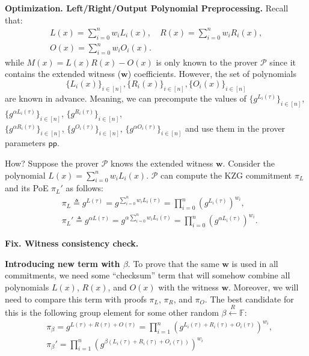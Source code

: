 \documentclass[../lecture-notes.tex]{subfiles}
\begin{document}
\textcolor{blue!75!gray}{\textbf{Optimization. Left/Right/Output Polynomial Preprocessing.}} Recall that:
\begin{gather*}
        L(x) = \sum_{i=0}^n w_iL_i(x), \quad R(x) = \sum_{i=0}^n w_i R_i(x), \\ O(x) = \sum_{i=0}^n w_iO_i(x).        
\end{gather*}
while $M(x) = L(x)R(x) - O(x)$ is only known to the prover $\mathcal{P}$ since it contains the extended witness ($\mathbf{w}$) coefficients. However, the set of polynomials
\begin{equation*}
    \{L_i(x)\}_{i \in [n]}, \{R_i(x)\}_{i \in [n]}, \{O_i(x)\}_{i \in [n]}
\end{equation*}
are known in advance. Meaning, we can precompute the values of $\{g^{L_i(\tau)}\}_{i \in [n]}$, $\{g^{\alpha L_i(\tau)}\}_{i \in [n]}$, $\{g^{R_i(\tau)}\}_{i \in [n]}$, \\ $\{g^{\alpha R_i(\tau)}\}_{i \in [n]}$, $\{g^{O_i(\tau)}\}_{i \in [n]}$, $\{g^{\alpha O_i(\tau)}\}_{i \in [n]}$ and use them in the prover parameters $\mathsf{pp}$.

How? Suppose the prover $\mathcal{P}$ knows the extended witness $\mathbf{w}$. Consider the polynomial $L(x) = \sum_{i=0}^n w_iL_i(x)$. $\mathcal{P}$ can compute the KZG commitment $\pi_L$ and its PoE $\pi_L'$ as follows:
\begin{equation*}
    \begin{aligned}
        &\pi_L \triangleq g^{L(\tau)} = g^{\sum_{i=0}^n w_iL_i(\tau)} = \prod_{i=0}^n (g^{L_i(\tau)})^{w_i}, \quad \\ &\pi_L' \triangleq g^{\alpha L(\tau)} = g^{\alpha \sum_{i=0}^n w_iL_i(\tau)} = \prod_{i=0}^n (g^{\alpha L_i(\tau)})^{w_i}.        
    \end{aligned}
\end{equation*}

\textcolor{green!50!black}{\textbf{Fix. Witness consistency check.}} 

\textbf{Introducing new term with $\beta$}. To prove that the same $\mathbf{w}$ is used in all commitments, we need some ``checksum'' term that will somehow combine all polynomials $L(x)$, $R(x)$, and $O(x)$ with the witness $\mathbf{w}$. Moreover, we will need to compare this term with proofs $\pi_L$, $\pi_R$, and $\pi_O$. The best candidate for this is the following group element for some other random $\beta \xleftarrow{R} \mathbb{F}$:
\begin{equation*}
    \begin{aligned}
        &\pi_{\beta} = g^{L(\tau) + R(\tau) + O(\tau)} = \prod_{i=1}^n (g^{L_i(\tau) + R_i(\tau) + O_i(\tau)})^{w_i}, \\ &\pi_{\beta}' = \prod_{i=1}^n (g^{\beta(L_i(\tau) + R_i(\tau) + O_i(\tau))})^{w_i}        
    \end{aligned}
\end{equation*}
\end{document}
